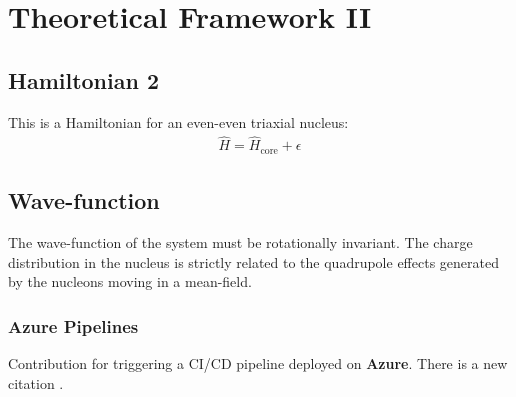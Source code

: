 \chapter{Theoretical Framework II}

\section{Hamiltonian 2}

This is a Hamiltonian for an even-even triaxial nucleus:
\begin{align}
    \hat{H}=\hat{H}_\text{core}+\epsilon
\end{align}

\lipsum[1-2]

\section{Wave-function}

The wave-function of the system must be rotationally invariant. The charge distribution in the nucleus is strictly related to the quadrupole effects generated by the nucleons moving in a mean-field.

\subsection{Azure Pipelines}

Contribution for triggering a CI/CD pipeline deployed on \textbf{Azure}. There is a new citation \cite{poenaru2021parity}.

\lipsum[1-2]